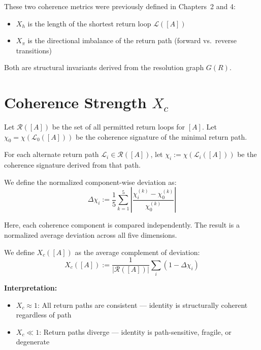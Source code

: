 These two coherence metrics were previously defined in Chapters~2 and 4:

\begin{itemize}
  \item $X_h$ is the length of the shortest return loop $\mathcal{L}([A])$
  \item $X_\pi$ is the directional imbalance of the return path (forward vs.\ reverse transitions)
\end{itemize}

Both are structural invariants derived from the resolution graph $G(R)$.

\section{Coherence Strength $X_c$}

Let $\mathcal{R}([A])$ be the set of all permitted return loops for $[A]$.  
Let $\chi_0 = \chi(\mathcal{L}_0([A]))$ be the coherence signature of the minimal return path.

For each alternate return path $\mathcal{L}_i \in \mathcal{R}([A])$, let $\chi_i := \chi(\mathcal{L}_i([A]))$  
be the coherence signature derived from that path.

\begin{definition} \label{def:chi-deviation}
We define the normalized component-wise deviation as:
\begin{equation} \label{eq:delta-chi}
\Delta \chi_i := \frac{1}{5} \sum_{k=1}^5 \left| \frac{\chi_i^{(k)} - \chi_0^{(k)}}{\chi_0^{(k)}} \right|
\end{equation}
\end{definition}

Here, each coherence component is compared independently.  
The result is a normalized average deviation across all five dimensions.

\begin{definition} \label{def:coherence-strength}
We define $X_c([A])$ as the average complement of deviation:
\begin{equation} \label{eq:xc-definition}
X_c([A]) := \frac{1}{|\mathcal{R}([A])|} \sum_i \left( 1 - \Delta \chi_i \right)
\end{equation}
\end{definition}

\textbf{Interpretation:}
\begin{itemize}
  \item $X_c \approx 1$: All return paths are consistent — identity is structurally coherent regardless of path
  \item $X_c \ll 1$: Return paths diverge — identity is path-sensitive, fragile, or degenerate
\end{itemize}

